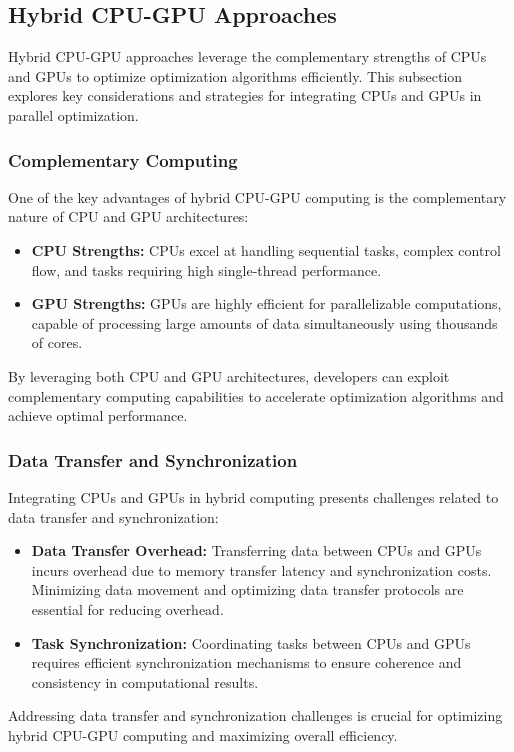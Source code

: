 \documentclass[11pt]{report}
\begin{document}
        \subsection{Hybrid CPU-GPU Approaches}
        Hybrid CPU-GPU approaches leverage the complementary strengths of CPUs and GPUs to optimize optimization algorithms efficiently. This subsection explores key considerations and strategies for integrating CPUs and GPUs in parallel optimization.
        \subsubsection{Complementary Computing}
        One of the key advantages of hybrid CPU-GPU computing is the complementary nature of CPU and GPU architectures:
        \begin{itemize}
            \item \textbf{CPU Strengths:} CPUs excel at handling sequential tasks, complex control flow, and tasks requiring high single-thread performance.
        
            \item \textbf{GPU Strengths:} GPUs are highly efficient for parallelizable computations, capable of processing large amounts of data simultaneously using thousands of cores.
        \end{itemize}
        By leveraging both CPU and GPU architectures, developers can exploit complementary computing capabilities to accelerate optimization algorithms and achieve optimal performance.
        
        \subsubsection{Data Transfer and Synchronization}
        Integrating CPUs and GPUs in hybrid computing presents challenges related to data transfer and synchronization:
        \begin{itemize}
            \item \textbf{Data Transfer Overhead:} Transferring data between CPUs and GPUs incurs overhead due to memory transfer latency and synchronization costs. Minimizing data movement and optimizing data transfer protocols are essential for reducing overhead.
        
            \item \textbf{Task Synchronization:} Coordinating tasks between CPUs and GPUs requires efficient synchronization mechanisms to ensure coherence and consistency in computational results.
        \end{itemize}
        Addressing data transfer and synchronization challenges is crucial for optimizing hybrid CPU-GPU computing and maximizing overall efficiency.
\end{document}
